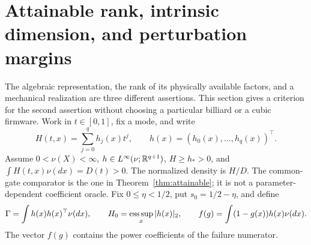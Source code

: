 \section{Attainable rank, intrinsic dimension, and perturbation margins}\label{sec:structural}
The algebraic representation, the rank of its physically available factors,
and a mechanical realization are three different assertions. This section
gives a criterion for the second assertion without choosing a particular
billiard or a cubic firmware. Work in $t\in[0,1]$, fix a mode, and write
\[
 H(t,x)=\sum_{j=0}^q h_j(x)t^j,\qquad
 h(x)=(h_0(x),\ldots,h_q(x))^\top.
\]
Assume $0<\nu(X)<\infty$, $h\in L^\infty(\nu;\mathbb R^{q+1})$,
$H\ge h_*>0$, and $\int H(t,x)\nu(dx)=D(t)>0$. The normalized density is
$H/D$. The common-gate comparator is the one in
Theorem~\ref{thm:attainable}; it is not a parameter-dependent coefficient
oracle. Fix $0\le\eta<1/2$, put $s_0=1/2-\eta$, and define
\[
 \Gamma=\int h(x)h(x)^\top\nu(dx),\qquad
 H_0=\mathop{\rm ess\,sup}_x|h(x)|_2,\qquad
 f(g)=\int(1-g(x))h(x)\nu(dx).
\]
The vector $f(g)$ contains the power coefficients of the failure numerator.

